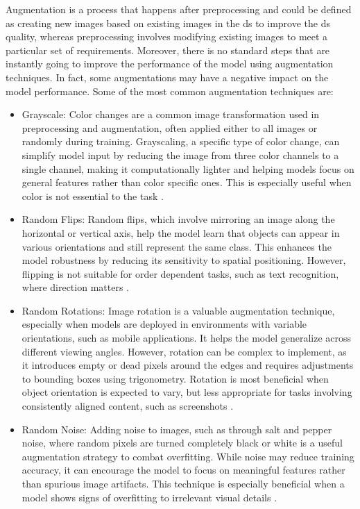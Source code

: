 Augmentation is a process that happens after preprocessing and could be defined as creating new images based on existing images in the \gls{ds} to improve the \gls{ds} quality, whereas preprocessing involves modifying existing images to meet a particular set of requirements. Moreover, there is no standard steps that are instantly going to improve the performance of the model using augmentation techniques. In fact, some augmentations may have a negative impact on the model performance. Some of the most common augmentation techniques are:
\begin{itemize}
    \item Grayscale: Color changes are a common image transformation used in preprocessing and augmentation, often applied either to all images or randomly during training. Grayscaling, a specific type of color change, can simplify model input by reducing the image from three color channels to a single channel, making it computationally lighter and helping models focus on general features rather than color specific ones. This is especially useful when color is not essential to the task \cite{Preprocessing_Augmentation}.
    \item Random Flips: Random flips, which involve mirroring an image along the horizontal or vertical axis, help the model learn that objects can appear in various orientations and still represent the same class. This enhances the model robustness by reducing its sensitivity to spatial positioning. However, flipping is not suitable for order dependent tasks, such as text recognition, where direction matters \cite{Preprocessing_Augmentation}.
    \item Random Rotations: Image rotation is a valuable augmentation technique, especially when models are deployed in environments with variable orientations, such as mobile applications. It helps the model generalize across different viewing angles. However, rotation can be complex to implement, as it introduces empty or dead pixels around the edges and requires adjustments to bounding boxes using trigonometry. Rotation is most beneficial when object orientation is expected to vary, but less appropriate for tasks involving consistently aligned content, such as screenshots \cite{Preprocessing_Augmentation}.
    \item Random Noise: Adding noise to images, such as through salt and pepper noise, where random pixels are turned completely black or white is a useful augmentation strategy to combat overfitting. While noise may reduce training accuracy, it can encourage the model to focus on meaningful features rather than spurious image artifacts. This technique is especially beneficial when a model shows signs of overfitting to irrelevant visual details \cite{Preprocessing_Augmentation}.
\end{itemize}



